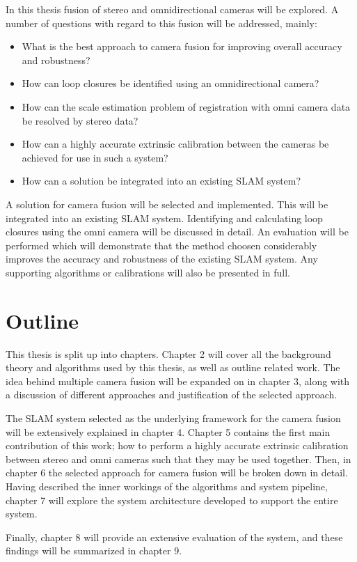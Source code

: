 In this thesis fusion of stereo and omnidirectional cameras will be explored.  A number of questions with regard to this fusion will be addressed, mainly:
\begin{itemize}
 \item What is the best approach to camera fusion for improving overall accuracy and robustness?
 \item How can loop closures be identified using an omnidirectional camera?
 \item How can the scale estimation problem of registration with omni camera data be resolved by stereo data?
 \item How can a highly accurate extrinsic calibration between the cameras be achieved for use in such a system?
 \item How can a solution be integrated into an existing SLAM system?
\end{itemize}

A solution for camera fusion will be selected and implemented.  This will be integrated into an existing SLAM system.  Identifying and calculating loop closures using the omni camera will be discussed in detail.  An evaluation will be performed which will demonstrate that the method choosen considerably improves the accuracy and robustness of the existing SLAM system.  Any supporting algorithms or calibrations will also be presented in full.

\section{Outline}

This thesis is split up into chapters.  Chapter 2 will cover all the background theory and  algorithms used by this thesis, as well as outline related work.  The idea behind multiple camera fusion will be expanded on in chapter 3, along with a discussion of different approaches and justification of the selected approach. 

The SLAM system selected as the underlying framework for the camera fusion will be extensively explained in chapter 4.  Chapter 5 contains the first main contribution of this work; how to perform a highly accurate extrinsic calibration between stereo and omni cameras such that they may be used together.  Then, in chapter 6 the selected approach for camera fusion will be broken down in detail.  Having described the inner workings of the algorithms and system pipeline, chapter 7 will explore the system architecture developed to support the entire system.

Finally, chapter 8 will provide an extensive evaluation of the system, and these findings will be summarized in chapter 9.